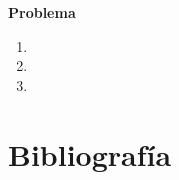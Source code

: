 \documentclass[11pt,letterpaper]{article}
\begin{document}
	
    
    
    \newpage
    \begin{center}
        \LARGE{\textbf{Problema}}\\
    \end{center}
    \normalsize
    \begin{enumerate}
        \item 
        \item 
        \item 
    \end{enumerate}
    
\newpage

\Large \section*{Bibliografía}
  
  
\end{document}
